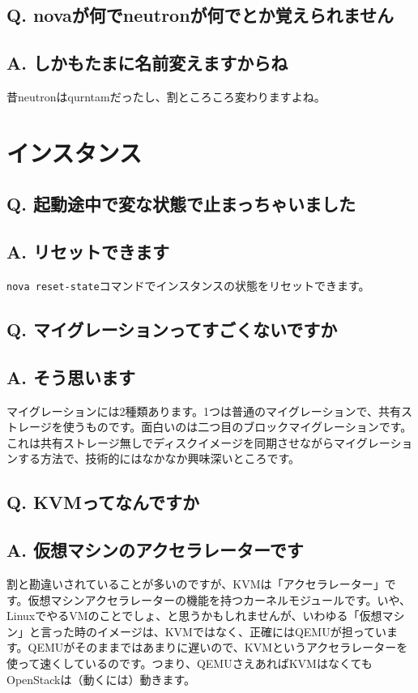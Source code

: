 \documentclass[9pt,b5paper,tombo,openany]{jsbook}
\begin{document}
\subsection*{{\LARGE\bfseries Q.} novaが何でneutronが何でとか覚えられません}
\subsection*{{\LARGE\bfseries A.} しかもたまに名前変えますからね}
昔neutronはqurntamだったし、割ところころ変わりますよね。

\section{インスタンス}

\subsection*{{\LARGE\bfseries Q.} 起動途中で変な状態で止まっちゃいました}
\subsection*{{\LARGE\bfseries A.} リセットできます}
\verb|nova reset-state|コマンドでインスタンスの状態をリセットできます。

\subsection*{{\LARGE\bfseries Q.} マイグレーションってすごくないですか}
\subsection*{{\LARGE\bfseries A.} そう思います}
マイグレーションには2種類あります。1つは普通のマイグレーションで、共有ストレージを使うものです。面白いのは二つ目のブロックマイグレーションです。これは共有ストレージ無しでディスクイメージを同期させながらマイグレーションする方法で、技術的にはなかなか興味深いところです。

\subsection*{{\LARGE\bfseries Q.} KVMってなんですか}
\subsection*{{\LARGE\bfseries A.} 仮想マシンのアクセラレーターです}
割と勘違いされていることが多いのですが、KVMは「アクセラレーター」です。仮想マシンアクセラレーターの機能を持つカーネルモジュールです。いや、LinuxでやるVMのことでしょ、と思うかもしれませんが、いわゆる「仮想マシン」と言った時のイメージは、KVMではなく、正確にはQEMUが担っています。QEMUがそのままではあまりに遅いので、KVMというアクセラレーターを使って速くしているのです。つまり、QEMUさえあればKVMはなくてもOpenStackは（動くには）動きます。
\end{document}
